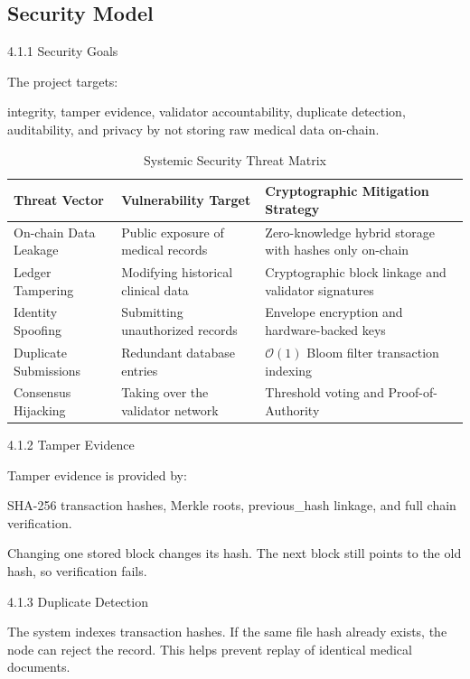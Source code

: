 \documentclass[12pt]{article}
\begin{document}
\subsection{Security Model}

4.1.1 Security Goals

The project targets:

 integrity, tamper evidence, validator accountability, duplicate detection, auditability, and privacy by not storing raw medical data on-chain.

\begin{table}[htbp]
\centering
\small
\renewcommand{\arraystretch}{1.15}
\caption{Systemic Security Threat Matrix}
\label{tab:threat-matrix}
\vspace{2mm}
\begin{tabularx}{\textwidth}{|Y|Y|Y|}
\hline
\textbf{Threat Vector} & \textbf{Vulnerability Target} & \textbf{Cryptographic Mitigation Strategy} \\ \hline
On-chain Data Leakage & Public exposure of medical records & Zero-knowledge hybrid storage with hashes only on-chain \\ \hline
Ledger Tampering & Modifying historical clinical data & Cryptographic block linkage and validator signatures \\ \hline
Identity Spoofing & Submitting unauthorized records & Envelope encryption and hardware-backed keys \\ \hline
Duplicate Submissions & Redundant database entries & $\mathcal{O}(1)$ Bloom filter transaction indexing \\ \hline
Consensus Hijacking & Taking over the validator network & Threshold voting and Proof-of-Authority \\ \hline
\end{tabularx}
\end{table}

4.1.2 Tamper Evidence

Tamper evidence is provided by:

 SHA-256 transaction hashes, Merkle roots, previous\_hash linkage, and full chain verification.

Changing one stored block changes its hash. The next block still points to the old hash, so verification fails.

4.1.3 Duplicate Detection

The system indexes transaction hashes. If the same file hash already exists, the node can reject the record. This helps prevent replay of identical medical documents.
\end{document}
